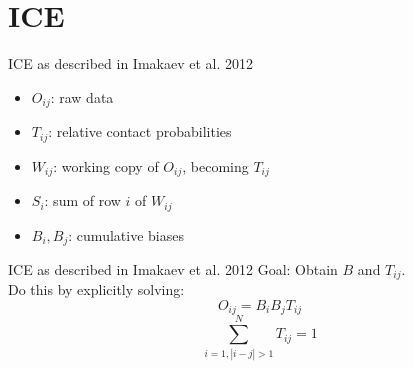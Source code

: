 \section{ICE}



\begin{frame}[c]{ICE as described in Imakaev et al. 2012 \cite{imakaev2012iterative}}
    \Large
    \begin{itemize}[<+(1)->]
        \item $O_{ij}$: raw data
        \item $T_{ij}$: relative contact probabilities
        \item $W_{ij}$: working copy of $O_{ij}$, becoming $T_{ij}$
        \item $S_i$: sum of row $i$ of $W_{ij}$
        \item $B_i, B_j$: cumulative biases
    \end{itemize}
\end{frame}

\begin{frame}[c]{ICE as described in Imakaev et al. 2012 \cite{imakaev2012iterative}}
    \Large
    Goal: Obtain $B$ and $T_{ij}$. \\ \pause Do this by explicitly solving:
    \begin{equation} \label{eq:1}
    O_{ij} = B_i B_j T_{ij}
    \end{equation}
    \begin{equation} \label{eq:2}
    \sum^N_{i=1, |i-j|>1} T_{ij} = 1
    \end{equation}
\end{frame}

